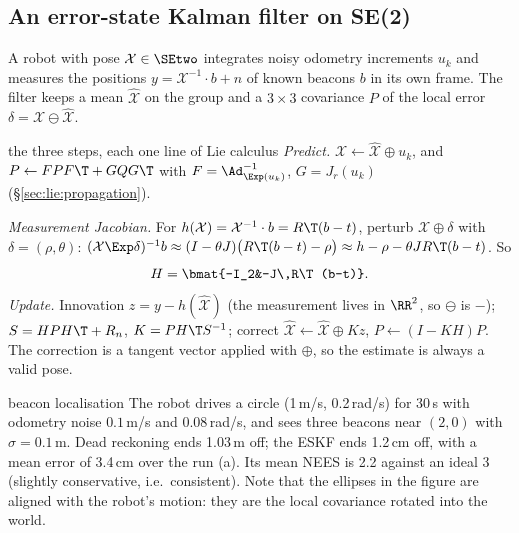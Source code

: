 \subsection{An error-state Kalman filter on SE(2)}\label{sec:lie:eskf}

A robot with pose $\mathcal X\in\SEtwo$ integrates noisy odometry increments $u_k$ and measures the positions $y=\mathcal X^{-1}\cdot b+n$ of known beacons $b$ in its own frame. The filter keeps a mean $\hat{\mathcal X}$ on the group and a $3\times3$ covariance $P$ of the local error $\delta=\mathcal X\ominus\hat{\mathcal X}$.

\begin{deriv}{the three steps, each one line of Lie calculus}
\emph{Predict.} $\hat{\mathcal X}\leftarrow\hat{\mathcal X}\oplus u_k$, and $P\leftarrow FPF\T+GQG\T$ with $F=\Ad_{\Exp(u_k)}^{-1}$, $G=J_r(u_k)$ (\S\ref{sec:lie:propagation}).

\emph{Measurement Jacobian.} For $h(\mathcal X)=\mathcal X^{-1}\cdot b=R\T(b-t)$, perturb $\mathcal X\oplus\delta$ with $\delta=(\rho,\theta)$: $(\mathcal X\Exp\delta)^{-1}b\approx(I-\theta J)\big(R\T(b-t)-\rho\big)\approx h-\rho-\theta JR\T(b-t)$. So
\[
H=\bmat{-I_2&-J\,R\T(b-t)}.
\]
\emph{Update.} Innovation $z=y-h(\hat{\mathcal X})$ (the measurement lives in $\RR^2$, so $\ominus$ is $-$); $S=HPH\T+R_n$, $K=PH\T S^{-1}$; correct $\hat{\mathcal X}\leftarrow\hat{\mathcal X}\oplus Kz$, $P\leftarrow(I-KH)P$. The correction is a tangent vector applied with $\oplus$, so the estimate is always a valid pose.
\end{deriv}

\begin{example}{beacon localisation}
The robot drives a circle (1\,m/s, 0.2\,rad/s) for 30\,s with odometry noise $0.1$\,m/s and $0.08$\,rad/s, and sees three beacons near $(2,0)$ with $\sigma=0.1$\,m. Dead reckoning ends 1.03\,m off; the ESKF ends 1.2\,cm off, with a mean error of 3.4\,cm over the run (a). Its mean NEES is 2.2 against an ideal 3 (slightly conservative, i.e.\ consistent). Note that the ellipses in the figure are aligned with the robot's motion: they are the local covariance rotated into the world.
\end{example}
